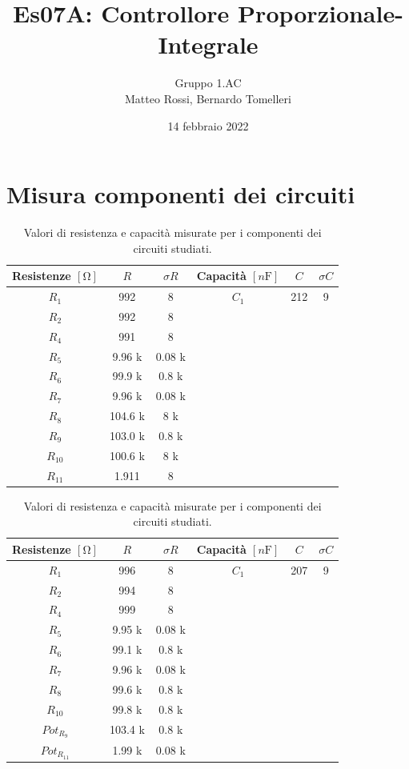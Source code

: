 \documentclass[10pt, a4paper, italian]{article}
\author{Gruppo 1.AC \\ Matteo Rossi, Bernardo Tomelleri}
\title{Es07A: Controllore Proporzionale-Integrale}
\begin{document}
\date{14 febbraio 2022}
\maketitle

\section{Misura componenti dei circuiti}
\begin{table}[htbp]
\centering
\begin{tabular}{cccccc}
\toprule
Resistenze $[\si{\ohm}]$ & $R$ & $\sigma R$ & Capacità $[\si{n\F}]$ & $C$ &
$\sigma C$ \\
\midrule
\midrule
$R_1$	  	& 992 	& 8		& $C_1$ & 212	& 9 \\
$R_2$	  	& 992	& 8		& & & \\
$R_4$	  	& 991	& 8		& & & \\
$R_5$	  	& 9.96 k	& 0.08	k& & & \\
$R_6$	  	& 99.9 k	& 0.8	k& & & \\
$R_7$	  	& 9.96 k& 0.08	k	& & & \\
$R_8$	  	& 104.6	k& 8		k& & & \\
$R_9$	  	& 103.0	k& 0.8	k	& & & \\
$R_{10}$  	& 100.6	k& 8		k& & & \\
$R_{11}$  	& 1.911	& 8		& & & \\
\bottomrule     
\end{tabular}
\caption{Valori di resistenza e capacità misurate per i componenti dei
circuiti studiati. \label{tab: rcmes_B}}

\begin{tabular}{cccccc}
\toprule
Resistenze $[\si{\ohm}]$ & $R$ & $\sigma R$ & Capacità $[\si{n\F}]$ & $C$ &
$\sigma C$ \\
\midrule
\midrule
$R_1$	  	& 996 	& 8		& $C_1$ & 207	& 9 \\
$R_2$	  	& 994	& 8		& & & \\
$R_4$	  	& 999	& 8		& & & \\
$R_5$	  	& 9.95	k& 0.08	k& & & \\
$R_6$	  	& 99.1	k& 0.8	k& & & \\
$R_7$	  	& 9.96	k& 0.08		k& & & \\
$R_8$	  	& 99.6	k& 0.8		k& & & \\
$R_{10}$  	& 99.8	k& 0.8		k& & & \\
$Pot_{R_9}$ & 103.4 k & 0.8 k& & & \\
$Pot_{R_{11}}$ & 1.99 k & 0.08 k& & &\\
\bottomrule   
\end{tabular}
\caption{Valori di resistenza e capacità misurate per i componenti dei
circuiti studiati. \label{tab: rcmes_M}}
\end{table}
\end{document}
